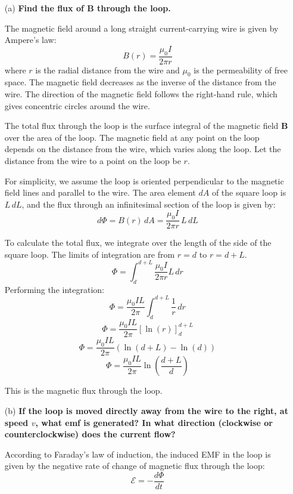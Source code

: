 \documentclass{article}
\begin{document}
\begin{enumerate}
    \item[(a)] \textbf{Find the flux of $\mathbf{B}$ through the loop.}
    
    The magnetic field around a long straight current-carrying wire is given by Ampere's law:
    \[
    B(r) = \frac{\mu_0 I}{2\pi r}
    \]
    where $r$ is the radial distance from the wire and $\mu_0$ is the permeability of free space. The magnetic field decreases as the inverse of the distance from the wire. The direction of the magnetic field follows the right-hand rule, which gives concentric circles around the wire.
    
    The total flux through the loop is the surface integral of the magnetic field $\mathbf{B}$ over the area of the loop. The magnetic field at any point on the loop depends on the distance from the wire, which varies along the loop. Let the distance from the wire to a point on the loop be $r$.
    
    For simplicity, we assume the loop is oriented perpendicular to the magnetic field lines and parallel to the wire. The area element $dA$ of the square loop is $L \, dL$, and the flux through an infinitesimal section of the loop is given by:
    \[
    d\Phi = B(r) \, dA = \frac{\mu_0 I}{2\pi r} \, L \, dL
    \]
    
    To calculate the total flux, we integrate over the length of the side of the square loop. The limits of integration are from $r = d$ to $r = d + L$.
    \[
    \Phi = \int_d^{d+L} \frac{\mu_0 I}{2\pi r} L \, dr
    \]
    Performing the integration:
    \[
    \Phi = \frac{\mu_0 I L}{2\pi} \int_d^{d+L} \frac{1}{r} \, dr
    \]
    \[
    \Phi = \frac{\mu_0 I L}{2\pi} \left[ \ln(r) \right]_d^{d+L}
    \]
    \[
    \Phi = \frac{\mu_0 I L}{2\pi} \left( \ln(d+L) - \ln(d) \right)
    \]
    \[
    \Phi = \frac{\mu_0 I L}{2\pi} \ln \left( \frac{d+L}{d} \right)
    \]
    
    This is the magnetic flux through the loop.

    \item[(b)] \textbf{If the loop is moved directly away from the wire to the right, at speed $v$, what emf is generated? In what direction (clockwise or counterclockwise) does the current flow?}
    
    According to Faraday's law of induction, the induced EMF in the loop is given by the negative rate of change of magnetic flux through the loop:
    \[
    \mathcal{E} = -\frac{d\Phi}{dt}
    \]
    

\end{enumerate}
\end{document}

